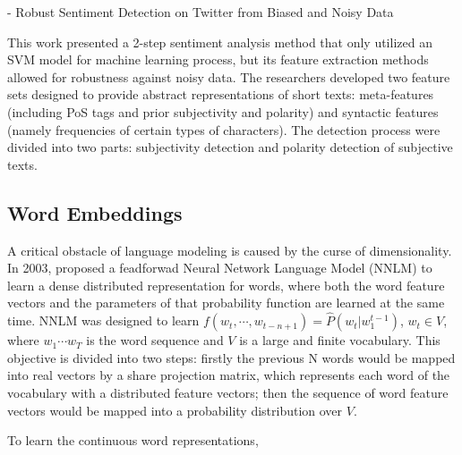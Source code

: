 \documentclass[12pt]{diazessay} %
\begin{document}
- Robust Sentiment Detection on Twitter from Biased and Noisy Data \citep{barbosa2010}

This work presented a 2-step sentiment analysis method that only utilized an SVM model for machine learning process, but its feature extraction methods allowed for robustness against noisy data. The researchers developed two feature sets designed to provide abstract representations of short texts: meta-features (including PoS tags and prior subjectivity and polarity) and syntactic features (namely frequencies of certain types of characters). The detection process were divided into two parts: subjectivity detection and polarity detection of subjective texts.




\subsection*{Word Embeddings}
A critical obstacle of language modeling is caused by the curse of dimensionality. In 2003, \citep{bengio2003neural} proposed a feadforwad Neural Network Language Model (NNLM) to learn a dense distributed representation\citep{hinton1986learning} for words, where both the word feature vectors and the parameters of that probability function are learned at the same time. NNLM was designed to learn $f \left( w _ { t } , \cdots , w _ { t - n + 1 } \right) = \hat { P } \left( w _ { t } | w _ { 1 } ^ { t - 1 } \right)$, $w _ { t } \in V$, where $w_1 \cdots w_T$ is the word sequence and $V$ is a large and finite vocabulary. This objective is divided into two steps: firstly the previous N words would be mapped into real vectors by a share projection matrix, which represents each word of the vocabulary with a distributed feature vectors; then the sequence of word feature vectors would be mapped into a probability distribution over $V$.

To learn the continuous word representations, \citep{mikolov2013efficient}


















\end{document}
